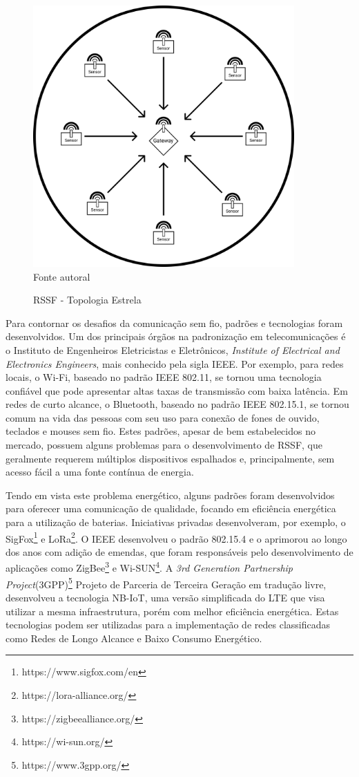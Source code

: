 \begin{figure}[ht]
    \begin{center}
        \caption{RSSF - Topologia Estrela}
        \includegraphics[width=10cm]{./sections/textual/chapters/images/intro_rssf.png}\\
        Fonte autoral
        \label{fig:rssf}
    \end{center}
\end{figure}

Para contornar os desafios da comunicação sem fio, padrões e tecnologias foram desenvolvidos. Um dos principais órgãos na padronização em telecomunicações é o Instituto de Engenheiros Eletricistas e Eletrônicos, \emph{Institute of Electrical and Electronics Engineers}, mais conhecido pela sigla IEEE. Por exemplo, para redes locais, o Wi-Fi, baseado no padrão IEEE 802.11, se tornou uma tecnologia confiável que pode apresentar altas taxas de transmissão com baixa latência. Em redes de curto alcance, o Bluetooth, baseado no padrão IEEE 802.15.1, se tornou comum na vida das pessoas com seu uso para conexão de fones de ouvido, teclados e mouses sem fio. Estes padrões, apesar de bem estabelecidos no mercado, possuem alguns problemas para o desenvolvimento de RSSF, que geralmente requerem múltiplos dispositivos espalhados e, principalmente, sem acesso fácil a uma fonte contínua de energia.

Tendo em vista este problema energético, alguns padrões foram desenvolvidos para oferecer uma comunicação de qualidade, focando em eficiência energética para a utilização de baterias. Iniciativas privadas desenvolveram, por exemplo, o SigFox\footnote{https://www.sigfox.com/en} e LoRa\footnote{https://lora-alliance.org/}. O IEEE desenvolveu o padrão 802.15.4 e o aprimorou ao longo dos anos com adição de emendas, que foram responsáveis pelo desenvolvimento de aplicações como ZigBee\footnote{https://zigbeealliance.org/} e Wi-SUN\footnote{https://wi-sun.org/}. A \emph{3rd Generation Partnership Project}(3GPP)\footnote{https://www.3gpp.org/} Projeto de Parceria de Terceira Geração em tradução livre, desenvolveu a tecnologia NB-IoT, uma versão simplificada do LTE que visa utilizar a mesma infraestrutura, porém com melhor eficiência energética. Estas tecnologias podem ser utilizadas para a implementação de redes classificadas como Redes de Longo Alcance e Baixo Consumo Energético.

